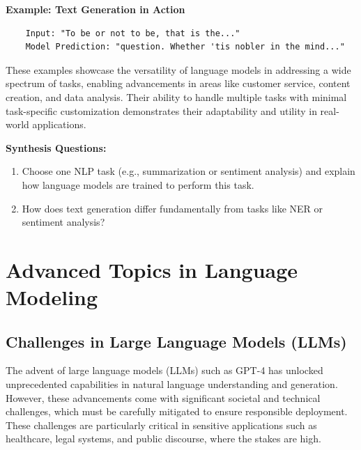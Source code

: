     \textbf{Example: Text Generation in Action}
    \begin{verbatim}
    Input: "To be or not to be, that is the..."
    Model Prediction: "question. Whether 'tis nobler in the mind..."
    \end{verbatim}

    These examples showcase the versatility of language models in addressing a wide spectrum of tasks, enabling advancements in areas like customer service, content creation, and data analysis. Their ability to handle multiple tasks with minimal task-specific customization demonstrates their adaptability and utility in real-world applications.

\begin{questionbox}
\textbf{Synthesis Questions:}

\begin{enumerate}
    \item Choose one NLP task (e.g., summarization or sentiment analysis) and explain how language models are trained to perform this task.
    \item How does text generation differ fundamentally from tasks like NER or sentiment analysis?
\end{enumerate}

\end{questionbox}

\section{Advanced Topics in Language Modeling}

\subsection{Challenges in Large Language Models (LLMs)}

    \large The advent of large language models (LLMs) such as GPT-4 has unlocked unprecedented capabilities in natural language understanding and generation. However, these advancements come with significant societal and technical challenges, which must be carefully mitigated to ensure responsible deployment. These challenges are particularly critical in sensitive applications such as healthcare, legal systems, and public discourse, where the stakes are high.

